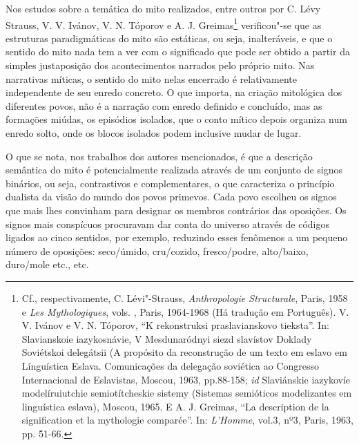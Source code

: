 Nos estudos sobre a temática do mito realizados, entre outros por C.
Lévy Strauss, V. V. Ivánov, V. N. Tóporov e A. J. Greimas\footnote{Cf.,
  respectivamente, C. Lévi"-Strauss, \emph{Anthropologie Structurale}, Paris,
  1958 e \emph{Les Mythologiques}, vols. , Paris, 1964-1968 (Há tradução
  em Português). V. V. Ivánov e V. N. Tóporov, ``K rekonstruksi
  praslavianskovo tieksta''. In: Slavianskoie iazykosnávie, V
  Mesdunaródnyi siezd slavístov Doklady Soviétskoi delegátsii (A
  propósito da reconstrução de um texto em eslavo em Línguística Eslava.
  Comunicações da delegação soviética ao  Congresso Internacional de
  Eslavistas, Moscou, 1963, pp.88-158; \emph{id} Slaviánskie iazykovíe
  modelíruiutchie semiotítcheskie sistemy (Sistemas semióticos
  modelizantes em linguística eslava), Moscou, 1965. E A. J. Greimas,
  ``La description de la signification et la mythologie
  comparée''. In: \emph{L'Homme}, vol.3, nº3, Paris, 1963, pp. 51-66.}
verificou"-se que as estruturas paradigmáticas do mito são estáticas, ou
seja, inalteráveis, e que o sentido do mito nada tem a ver com o
significado que pode ser obtido a partir da simples justaposição dos
acontecimentos narrados pelo próprio mito. Nas narrativas míticas, o
sentido do mito nelas encerrado é relativamente independente de seu
enredo concreto. O que importa, na criação mitológica dos diferentes
povos, não é a narração com enredo definido e concluído, mas as
formações miúdas, os episódios isolados, que o conto mítico depois
organiza num enredo solto, onde os blocos isolados podem inclusive mudar
de lugar.

O que se nota, nos trabalhos dos autores mencionados, é que a
descrição semântica do mito é potencialmente realizada através de um
conjunto de signos binários, ou seja, contrastivos e complementares,
o que caracteriza o princípio dualista da visão do mundo dos povos
primevos. Cada povo escolheu os signos que mais lhes convinham para
designar os membros contrários das oposições. Os signos mais conspícuos
procuravam dar conta do universo através de códigos ligados ao cinco
sentidos, por exemplo, reduzindo esses fenômenos a um pequeno número de
oposições: seco/úmido, cru/cozido, fresco/podre, alto/baixo, duro/mole
etc., etc.

